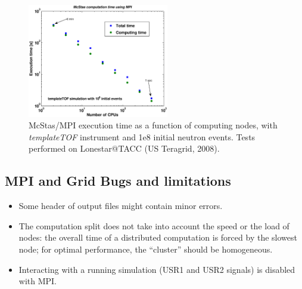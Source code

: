 \begin{figure}[htb!]
  \begin{center}
    \includegraphics[width=0.55\textwidth]{figures/mpi_efficiency.eps}
  \end{center}
  \caption{McStas/MPI execution time as a function of computing nodes, with {\it
      templateTOF} instrument and 1e8 initial neutron events. Tests performed on
    Lonestar@TACC (US Teragrid, 2008).}
\label{fig:mpi_efficiency}
\end{figure}

\subsection{MPI and Grid Bugs and limitations}

\begin{itemize}
\item Some header of output files might contain minor errors.
\item The computation split does not take into account the speed or the
  load of nodes: the overall time of a distributed computation is
  forced by the slowest node; for optimal performance, the ``cluster''
  should be homogeneous.
\item Interacting with a running simulation (USR1 and USR2 signals) is disabled
  with MPI.
\end{itemize}

